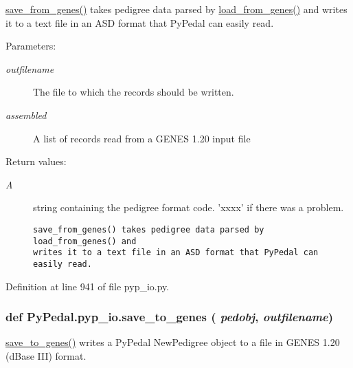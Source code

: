 \hyperlink{namespacePyPedal_1_1pyp__io_ad4bb26c9f774a572fb64300db6cdbfb}{save\_\-from\_\-genes()} takes pedigree data parsed by \hyperlink{namespacePyPedal_1_1pyp__io_f8605ce996a153170ed565840990ed0c}{load\_\-from\_\-genes()} and writes it to a text file in an ASD format that Py\-Pedal can easily read. 

\begin{Desc}
\item[Parameters:]
\begin{description}
\item[{\em outfilename}]The file to which the records should be written. \item[{\em assembled}]A list of records read from a GENES 1.20 input file \end{description}
\end{Desc}
\begin{Desc}
\item[Return values:]
\begin{description}
\item[{\em A}]string containing the pedigree format code. 'xxxx' if there was a problem.

\footnotesize\begin{verbatim}save_from_genes() takes pedigree data parsed by load_from_genes() and
writes it to a text file in an ASD format that PyPedal can easily read.
\end{verbatim}
\normalsize
 \end{description}
\end{Desc}


Definition at line 941 of file pyp\_\-io.py.\hypertarget{namespacePyPedal_1_1pyp__io_9ac6e6f02042c2309f1ecb2d24e98249}{
\subsubsection[save\_\-to\_\-genes]{\setlength{\rightskip}{0pt plus 5cm}def Py\-Pedal.pyp\_\-io.save\_\-to\_\-genes ( {\em pedobj},  {\em outfilename})}}
\label{namespacePyPedal_1_1pyp__io_9ac6e6f02042c2309f1ecb2d24e98249}


\hyperlink{namespacePyPedal_1_1pyp__io_9ac6e6f02042c2309f1ecb2d24e98249}{save\_\-to\_\-genes()} writes a Py\-Pedal New\-Pedigree object to a file in GENES 1.20 (d\-Base III) format. 

